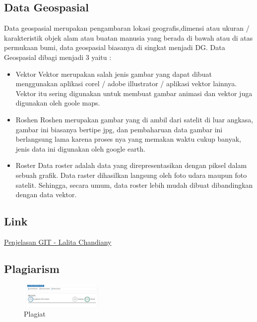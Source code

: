 \subsection{Data Geospasial}
Data geospasial merupakan pengambaran lokasi geografis,dimensi atau ukuran / karakteristik objek alam atau buatan manusia yang berada di bawah atau di atas permukaan bumi, data geospasial biasanya di singkat menjadi DG.
\hfill\break
Data Geospasial dibagi menjadi 3 yaitu :
\begin{itemize}
	\item Vektor
	Vektor merupakan salah jenis gambar yang dapat dibuat menggunakan aplikasi corel / adobe illustrator / aplikasi vektor lainnya. \hfill\break 
	Vektor itu sering digunakan untuk membuat gambar animasi dan vektor juga digunakan oleh goole maps.
	\item Roshen
	Roshen merupakan gambar yang di ambil dari satelit di luar angkasa, gambar ini biasanya bertipe jpg, dan pembaharuan data gambar ini berlangsung lama karena proses nya yang memakan waktu cukup banyak, jenis data ini digunakan oleh google earth.
	\item Roster
Data roster adalah data yang direpresentasikan dengan piksel dalam sebuah grafik. Data raster dihasilkan langsung oleh foto udara maupun foto satelit. Sehingga, secara umum, data roster lebih mudah dibuat dibandingkan dengan data vektor.
\end{itemize}

\subsection{Link}
\href{https://www.youtube.com/watch?v=Rw-D2J1h480}{Penjelasan GIT - Lalita Chandiany}
\subsection{Plagiarism}
\begin{figure}[H]
	\includegraphics[width=4cm]{figures/1174025/plagiat.jpg}
	\centering
	\caption{Plagiat}
\end{figure}
